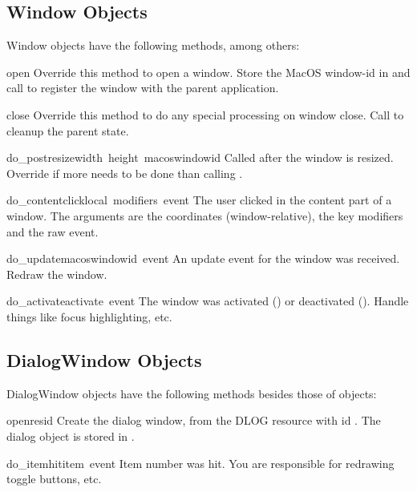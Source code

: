 \subsection{Window Objects}

Window objects have the following methods, among others:

\renewcommand{\indexsubitem}{(Window method)}

\begin{funcdesc}{open}{}
Override this method to open a window. Store the MacOS window-id in
 and call  to register the
window with the parent application.
\end{funcdesc}

\begin{funcdesc}{close}{}
Override this method to do any special processing on window
close. Call  to cleanup the parent state.
\end{funcdesc}

\begin{funcdesc}{do_postresize}{width\, height\, macoswindowid}
Called after the window is resized. Override if more needs to be done
than calling .
\end{funcdesc}

\begin{funcdesc}{do_contentclick}{local\, modifiers\, event}
The user clicked in the content part of a window. The arguments are
the coordinates (window-relative), the key modifiers and the raw
event.
\end{funcdesc}

\begin{funcdesc}{do_update}{macoswindowid\, event}
An update event for the window was received. Redraw the window.
\end{funcdesc}

\begin{funcdesc}{do_activate}{activate\, event}
The window was activated () or deactivated
(). Handle things like focus highlighting, etc.
\end{funcdesc}

\subsection{DialogWindow Objects}

DialogWindow objects have the following methods besides those of
 objects:

\renewcommand{\indexsubitem}{(DialogWindow method)}

\begin{funcdesc}{open}{resid}
Create the dialog window, from the DLOG resource with id
. The dialog object is stored in .
\end{funcdesc}

\begin{funcdesc}{do_itemhit}{item\, event}
Item number  was hit. You are responsible for redrawing
toggle buttons, etc.
\end{funcdesc}

